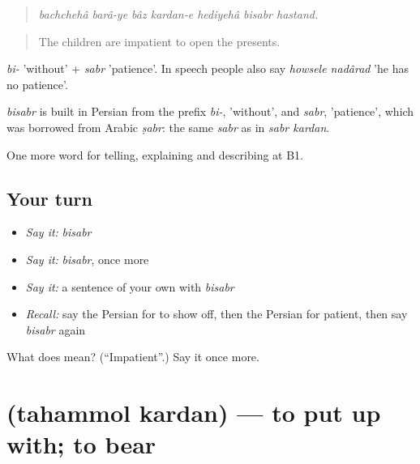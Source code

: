 \begin{quote}
\emph{bachchehâ barâ-ye bâz kardan-e hediyehâ bisabr hastand.}
\end{quote}

\begin{quote}
The children are impatient to open the presents.
\end{quote}

\emph{bi-} 'without' + \emph{sabr} 'patience'. In speech people also say \emph{howsele nadârad} 'he has no patience'.

\begin{cousinweb}
\emph{bisabr} is built in Persian from the prefix \emph{bi-}, 'without', and \emph{sabr}, 'patience', which was borrowed from Arabic \emph{ṣabr}: the same \emph{sabr} as in \emph{sabr kardan}.
\end{cousinweb}

\begin{grammarlens}[title={What you've built}]
One more word for telling, explaining and describing at B1.
\end{grammarlens}

\subsection*{Your turn}
\begin{itemize}
\raggedright
  \item \emph{Say it:} \emph{bisabr}
  \item \emph{Say it:} \emph{bisabr}, once more
  \item \emph{Say it:} a sentence of your own with \emph{bisabr}
  \item \emph{Recall:} say the Persian for to show off, then the Persian for patient, then say \emph{bisabr} again
\end{itemize}

\begin{tcolorbox}[breakable,colback=teal!4,colframe=teal!35!black,title={Before you move on}]
What does  mean? (\textquotedblleft{}Impatient\textquotedblright{}.) Say it once more.
\end{tcolorbox}
\section[\texorpdfstring{\fa{تحمل} \fa{کردن} (tahammol kardan)}{تحمل کردن (tahammol kardan)}]{  (tahammol kardan) — to put up with; to bear}

\label{lesson:FA-C481-tahammol-kardan}



